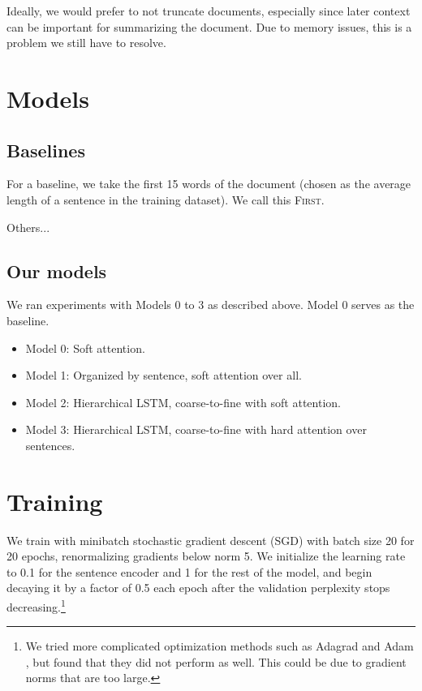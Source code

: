 \documentclass[11pt]{report}
\begin{document}
Ideally, we would prefer to not truncate documents, especially since later context can be important for summarizing the document. Due to memory issues, this is a problem we still have to resolve.

\section{Models}

\subsection{Baselines}

For a baseline, we take the first 15 words of the document (chosen as the average length of a sentence in the training dataset). We call this \textsc{First}.

Others...


\subsection{Our models}

We ran experiments with Models 0 to 3 as described above. Model 0 serves as the baseline.

\begin{itemize}
\item Model 0: Soft attention.
\item Model 1: Organized by sentence, soft attention over all.
\item Model 2: Hierarchical LSTM, coarse-to-fine with soft attention.
\item Model 3: Hierarchical LSTM, coarse-to-fine with hard attention over sentences.
\end{itemize}



\section{Training}

We train with minibatch stochastic gradient descent (SGD) with batch size 20 for 20 epochs, renormalizing gradients below norm 5. We initialize the learning rate to 0.1 for the sentence encoder and 1 for the rest of the model, and begin decaying it by a factor of 0.5 each epoch after the validation perplexity stops decreasing.\footnote{We tried more complicated optimization methods such as Adagrad \citep{Duchi2011} and Adam \citep{Kingma2015}, but found that they did not perform as well. This could be due to gradient norms that are too large.}
\end{document}
